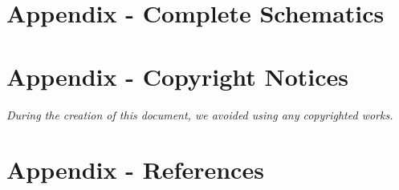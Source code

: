 \section{Appendix - Complete Schematics}

\label{apx:base-station-sch}

\label{apx:power-board-sch}

\label{apx:control-module-sch}

\section{Appendix - Copyright Notices}
\emph{During the creation of this document, we avoided using any copyrighted works.}

\thispagestyle{empty}
\pagestyle{empty}

\section{Appendix - References}

\renewcommand{\refname}{\centerline{\Large\bf References Cited}}


